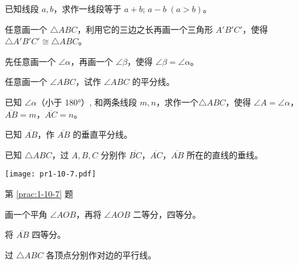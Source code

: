 \begin{Practice}
\begin{question}
	\item 已知线段 $a,b$，求作一线段等于 $a+b$; $a-b\; (a>b)$。
	\item 任意画一个 $\triangle ABC$，利用它的三边之长再画一个三角形 $A'B'C'$，使得 $\triangle A'B'C'\cong \triangle ABC$。
	\item 先任意画一个 $\angle \alpha$，再画一个 $\angle \beta$，使得 $\angle \beta=\angle\alpha$。
	\item 任意画一个 $\angle ABC$，试作 $\angle ABC$ 的平分线。
	\item 已知 $\angle \alpha$（小于 \ang{180}）, 和两条线段 $m,n$，求作一个$\triangle ABC$，使得 $\angle A=\angle \alpha$，$\overline{AB}=m$，$\overline{AC}=n$。
	\item 已知 $\overline{AB}$，作 $\overline{AB}$ 的垂直平分线。
	\item\label{prac:1-10-7} 已知 $\triangle ABC$，过 $A,B,C$ 分别作 $\overline{BC}$，$\overline{AC}$，$\overline{AB}$ 所在的直线的垂线。
	\begin{figurehere}
		\begin{minipage}{\linewidth}\centering
			\texttt{[image: pr1-10-7.pdf]}
			\caption*{第 \ref{prac:1-10-7} 题}
		\end{minipage}
	\end{figurehere}
	\item 画一个平角 $\angle AOB$，再将 $\angle AOB$ 二等分，四等分。
	\item 将 $\overline{AB}$ 四等分。
	\item 过 $\triangle ABC$ 各顶点分别作对边的平行线。
\end{question}
\end{Practice}



